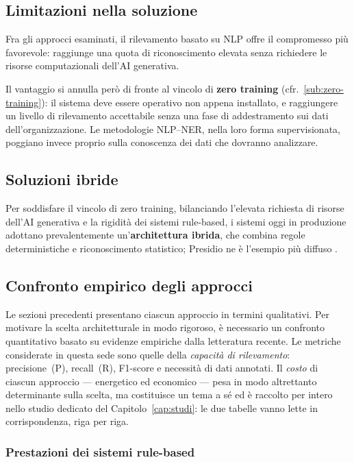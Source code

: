 \subsection{Limitazioni nella soluzione}
\label{sub:limitazioni-soluzione}
Fra gli approcci esaminati, il rilevamento basato su NLP offre il compromesso più favorevole: raggiunge una quota di riconoscimento elevata senza richiedere le risorse computazionali dell'AI generativa. \medskip

Il vantaggio si annulla però di fronte al vincolo di \textbf{zero training} (cfr.~\ref{sub:zero-training}): il sistema deve essere operativo non appena installato, e raggiungere un livello di rilevamento accettabile senza una fase di addestramento sui dati dell'organizzazione. Le metodologie NLP--NER, nella loro forma supervisionata, poggiano invece proprio sulla conoscenza dei dati che dovranno analizzare.

\subsection{Soluzioni ibride}
\label{sub:soluzioni-ibride}
Per soddisfare il vincolo di zero training, bilanciando l'elevata richiesta di risorse dell'AI generativa e la rigidità dei sistemi rule-based, i sistemi oggi in produzione adottano prevalentemente un'\textbf{architettura ibrida}, che combina regole deterministiche e riconoscimento statistico; Presidio ne è l'esempio più diffuso \cite{PDFEnterpriseScalePII2026}.

\subsection{Confronto empirico degli approcci}
\label{sub:confronto-empirico}

Le sezioni precedenti presentano ciascun approccio in termini qualitativi. Per motivare la scelta architetturale in modo rigoroso, è necessario un confronto quantitativo basato su evidenze empiriche dalla letteratura recente. Le metriche considerate in questa sede sono quelle della \emph{capacità di rilevamento}: precisione~(P), recall~(R), F1-score e necessità di dati annotati. Il \emph{costo} di ciascun approccio --- energetico ed economico --- pesa in modo altrettanto determinante sulla scelta, ma costituisce un tema a sé ed è raccolto per intero nello studio dedicato del Capitolo~\ref{cap:studi}: le due tabelle vanno lette in corrispondenza, riga per riga.

\subsubsection*{Prestazioni dei sistemi rule-based}

